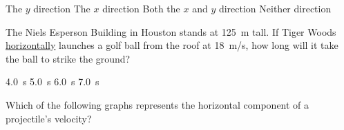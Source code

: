\documentclass[answers]{exam}
\begin{document}
\begin{questions}
\begin{randomizechoices}[keeplast]
    \correctchoice The $y$ direction
    \choice The $x$ direction
    \choice Both the $x$ and $y$ direction
    \choice Neither direction
\end{randomizechoices}

\question
The Niels Esperson Building in Houston stands at \SI{125}{m} tall. If Tiger Woods \underline{horizontally} launches a golf ball from the roof at \SI{18}{m/s}, how long will it take the ball to strike the ground?

\begin{center}
\end{center}


\begin{randomizechoices}[norandomize]
    \choice \SI{4.0}{s}
    \correctchoice \SI{5.0}{s}
    \choice \SI{6.0}{s}
    \choice \SI{7.0}{s}
\end{randomizechoices}

\clearpage

\question
Which of the following graphs represents the horizontal component of a projectile's velocity?


\end{questions}
\end{document}
